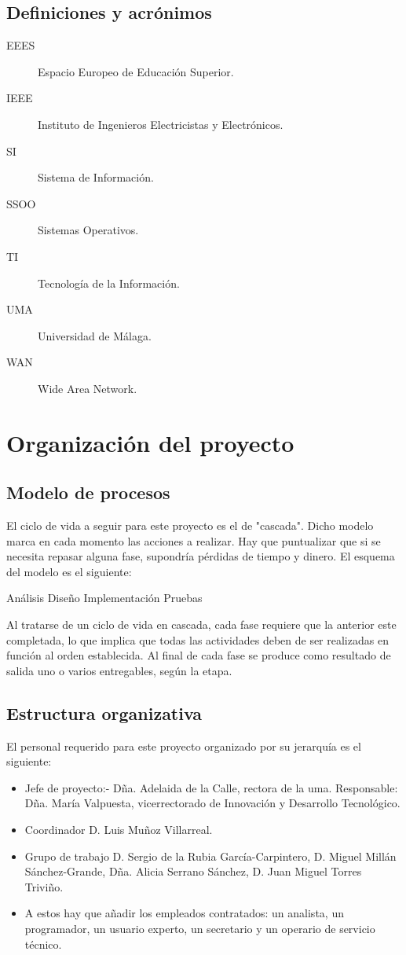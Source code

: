 \documentclass[11pt,a4paper,spanish,twoside]{report}
\begin{document}
\section{Definiciones y acrónimos}
\begin{description}
\item[EEES] Espacio Europeo de Educación Superior.
\item[IEEE] Instituto de Ingenieros Electricistas y Electrónicos.
\item[SI] Sistema de Información.
\item[SSOO] Sistemas Operativos.
\item[TI] Tecnología de la Información.
\item[UMA] Universidad de Málaga.
\item[WAN] Wide Area Network.
\end{description}

\chapter{Organización del proyecto}
\section{Modelo de procesos}
El ciclo de vida a seguir para este proyecto es el de "cascada". Dicho 
modelo marca en cada momento las acciones a realizar. Hay que puntualizar 
que si se necesita repasar alguna fase, supondría pérdidas de tiempo y dinero.
El esquema del modelo es el siguiente:

Análisis
    Diseño
        Implementación
            Pruebas

Al tratarse de un ciclo de vida en cascada, cada fase requiere que la anterior 
este completada, lo que implica que todas las actividades deben de ser 
realizadas en función al orden establecida. Al final de cada fase se produce 
como resultado de salida uno o varios entregables, según la etapa.

\section{Estructura organizativa}
El personal requerido para este proyecto organizado por su jerarquía es el 
siguiente:
\begin{itemize}
\item Jefe de proyecto:- Dña. Adelaida de la Calle, rectora de la uma.
  Responsable: Dña. María Valpuesta, vicerrectorado de Innovación y Desarrollo 
  Tecnológico.
\item Coordinador D. Luis Muñoz Villarreal.
\item Grupo de trabajo D. Sergio de la Rubia García-Carpintero, D. Miguel 
  Millán Sánchez-Grande, Dña. Alicia Serrano Sánchez, D. Juan Miguel Torres 
  Triviño. 
\item A estos hay que añadir los empleados contratados: un analista, un 
  programador, un usuario experto, un secretario y un operario de servicio 
  técnico.
\end{itemize}
\end{document}
